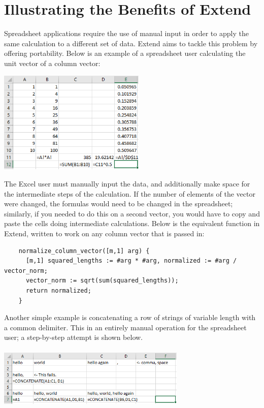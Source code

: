 \section{Illustrating the Benefits of Extend}
Spreadsheet applications require the use of manual input in order to apply the same calculation to a different set of data. Extend aims to tackle this problem by offering portability. Below is an example of a spreadsheet user calculating the unit vector of a column vector:

\begin{center}
\includegraphics[width=7cm]{img/unitvector.png}
\end{center}

\medskip \noindent The Excel user must manually input the data, and additionally make space for the intermediate steps of the calculation. If the number of elements of the vector were changed, the formulas would need to be changed in the spreadsheet; similarly, if you needed to do this on a second vector, you would have to copy and paste the cells doing intermediate calculations. Below is the equivalent function in Extend, written to work on any column vector that is passed in:

\begin{lstlisting}
	normalize_column_vector([m,1] arg) {
	  [m,1] squared_lengths := #arg * #arg, normalized := #arg / vector_norm;
	  vector_norm := sqrt(sum(squared_lengths));
	  return normalized;
	}
\end{lstlisting}

\medskip \noindent Another simple example is concatenating a row of strings of variable length with a common delimiter. This in an entirely manual operation for the spreadsheet user; a step-by-step attempt is shown below.

\begin{center}
\includegraphics[width=9cm,height=3cm]{img/concatenation.png}
\end{center}

